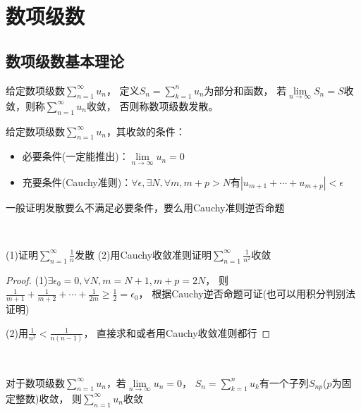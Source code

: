 
\chapter{数项级数}

\section{数项级数基本理论}

\begin{definition}[数项级数收敛]
  给定数项级数$\sum\limits_{n = 1}^{\infty}u_n$，
  定义$S_n = \sum\limits_{k= 1}^n u_n$为部分和函数，
  若$\lim \limits _{n \rightarrow \infty} S_n = S$收敛，则称$\sum\limits_{n = 1}^{\infty}u_n$收敛，
  否则称数项级数发散。
\end{definition}

\begin{theorem}[数项级数收敛的各种条件]
  给定数项级数$\sum\limits_{n = 1}^{\infty}u_n$，其收敛的条件：
  \begin{itemize}
  \item 必要条件(一定能推出)：$\lim \limits _{n \rightarrow \infty} u_n = 0$
  \item 充要条件(Cauchy准则)：$\forall \epsilon, \exists N, \forall m, m+p> N$有$|u_{m+1} + \cdots + u_{m+p}| < \epsilon$
  \end{itemize}
\end{theorem}

\begin{note}
  一般证明发散要么不满足必要条件，要么用Cauchy准则逆否命题
\end{note}

~

\begin{exercise}[Cauchy收敛准则]
  (1)证明$\sum\limits_{n = 1}^{\infty} \frac{1}{n}$发散
  (2)用Cauchy收敛准则证明$\sum\limits_{n = 1}^{\infty}\frac{1}{n^2}$收敛
\end{exercise}

\begin{proof}
  (1)$\exists \epsilon_0 = 0, \forall N, m = N+1, m+p = 2N$，
  则$\frac{1}{m+1} + \frac{1}{m+2} + \cdots + \frac{1}{2m} \geq \frac{1}{2} = \epsilon_0$，
  根据Cauchy逆否命题可证(也可以用积分判别法证明)

  (2)用$\frac{1}{n^2} < \frac{1}{n(n-1)}$，
  直接求和或者用Cauchy收敛准则都行
\end{proof}

~

\begin{theorem}[子列问题]
  对于数项级数$\sum\limits_{n = 1}^{\infty}u_n$，若$\lim \limits _{n \rightarrow \infty}u_n = 0$，
  $S_n = \sum\limits_{k = 1}^n u_k$有一个子列$S_{np}$($p$为固定整数)收敛，
  则$\sum\limits_{n = 1}^{\infty}u_n$收敛
\end{theorem}

